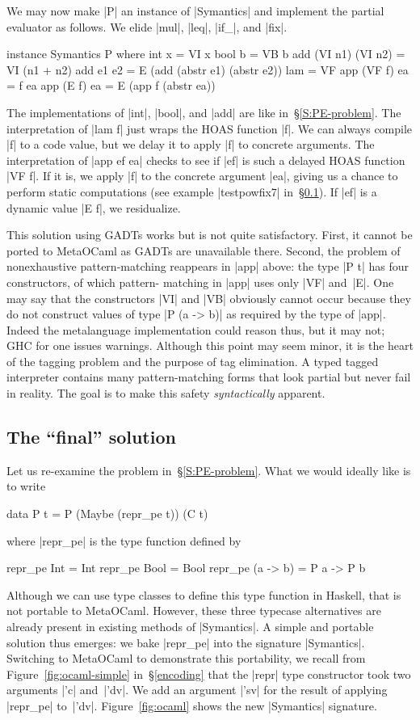 \documentclass[preprint]{sigplanconf}
\begin{document}
We may now make |P| an instance of
|Symantics| and implement the partial evaluator as follows. We elide
|mul|, |leq|, |if_|, and |fix|.
\begin{code}
instance Symantics P where
  int x  = VI x
  bool b = VB b
  add (VI n1) (VI n2) = VI (n1 + n2)
  add e1 e2 = E (add (abstr e1) (abstr e2))
  lam = VF
  app (VF f) ea = f ea
  app (E f)  ea = E (app f (abstr ea))
\end{code}
The implementations of |int|, |bool|, and |add| are like
in~\S\ref{S:PE-problem}.
The interpretation of |lam f| just wraps the
HOAS function |f|. We can always compile |f| to a code value,
but we delay it to apply |f| to concrete arguments. The interpretation of
|app ef ea| checks to see if |ef| is such a delayed
HOAS function |VF f|. If it is, we apply |f| to the
concrete argument |ea|, giving us a chance to perform static
computations (see example |testpowfix7| in~\S\ref{S:PE-solution}). If |ef| is a
dynamic value |E f|, we residualize.

This solution using GADTs works but is not quite satisfactory. First, it
cannot be ported to MetaOCaml as GADTs are unavailable there.  Second,
the problem of nonexhaustive pattern\hyp matching reappears in |app|
above: the type |P t| has four constructors, of which pattern\hyp
matching in |app| uses only |VF| and~|E|. One may say that the
constructors |VI| and |VB| obviously cannot occur because they do not
construct values of type |P (a -> b)| as required by the type of |app|.
Indeed the metalanguage implementation could reason thus, but it may not; GHC for one
issues warnings.  Although this point may seem minor, it is the heart of
the tagging problem and the purpose of tag elimination. A typed tagged
interpreter contains many pattern\hyp matching forms that look partial
but never fail in reality. The goal is to make this safety
\emph{syntactically} apparent.

\subsection{The ``final'' solution}
\label{S:PE-solution}
Let us re-examine the problem in~\S\ref{S:PE-problem}. What we
would ideally like is to write
\begin{code}
data P t = P (Maybe (repr_pe t)) (C t)
\end{code}
where |repr_pe| is the type function defined
by
\begin{code}
repr_pe Int      = Int
repr_pe Bool     = Bool
repr_pe (a -> b) = P a -> P b
\end{code}
Although we can use type classes to define this type function
in Haskell, that is not portable to MetaOCaml. However,
these three typecase alternatives are already present in existing
methods of |Symantics|.
A simple and portable solution thus emerges: we bake |repr_pe| 
into the signature |Symantics|. Switching to MetaOCaml to demonstrate this
portability, we recall from Figure~\ref{fig:ocaml-simple} in~\S\ref{encoding} that the |repr| type
constructor took two arguments |'c| and~|'dv|. We add an argument
|'sv| for the result of applying |repr_pe| to~|'dv|.
Figure~\ref{fig:ocaml} shows the new |Symantics| signature.
\end{document}

